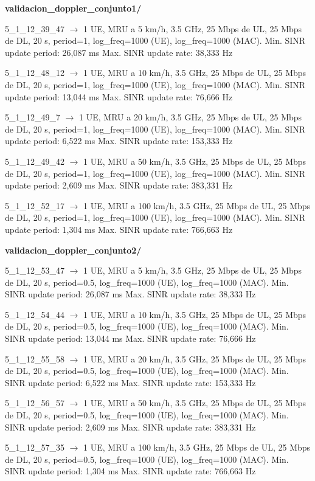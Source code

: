 \documentclass[12pt]{report} %
\begin{document}
\textbf{validacion\_doppler\_conjunto1/}

5\_1\_12\_39\_47 $\rightarrow$ 1 UE, MRU a 5 km/h, 3.5 GHz, 25 Mbps de UL, 25 Mbps de DL, 20 s, period=1, log\_freq=1000 (UE), log\_freq=1000 (MAC).
Min. SINR update period: 26,087 ms
Max. SINR update rate: 38,333 Hz

5\_1\_12\_48\_12 $\rightarrow$ 1 UE, MRU a 10 km/h, 3.5 GHz, 25 Mbps de UL,  25 Mbps de DL, 20 s, period=1, log\_freq=1000 (UE), log\_freq=1000 (MAC).
Min. SINR update period: 13,044 ms
Max. SINR update rate: 76,666 Hz

5\_1\_12\_49\_7 $\rightarrow$ 1 UE, MRU a 20 km/h, 3.5 GHz, 25 Mbps de UL,  25 Mbps de DL, 20 s, period=1, log\_freq=1000 (UE), log\_freq=1000 (MAC).
Min. SINR update period: 6,522 ms
Max. SINR update rate: 153,333 Hz

5\_1\_12\_49\_42 $\rightarrow$ 1 UE, MRU a 50 km/h, 3.5 GHz, 25 Mbps de UL,  25 Mbps de DL, 20 s, period=1, log\_freq=1000 (UE), log\_freq=1000 (MAC).
Min. SINR update period: 2,609 ms
Max. SINR update rate: 383,331 Hz

5\_1\_12\_52\_17 $\rightarrow$ 1 UE, MRU a 100 km/h, 3.5 GHz, 25 Mbps de UL,  25 Mbps de DL, 20 s, period=1, log\_freq=1000 (UE), log\_freq=1000 (MAC).
Min. SINR update period: 1,304 ms
Max. SINR update rate: 766,663 Hz

\textbf{validacion\_doppler\_conjunto2/}

5\_1\_12\_53\_47 $\rightarrow$ 1 UE, MRU a 5 km/h, 3.5 GHz, 25 Mbps de UL,  25 Mbps de DL, 20 s, period=0.5, log\_freq=1000 (UE), log\_freq=1000 (MAC).
Min. SINR update period: 26,087 ms
Max. SINR update rate: 38,333 Hz

5\_1\_12\_54\_44 $\rightarrow$ 1 UE, MRU a 10 km/h, 3.5 GHz, 25 Mbps de UL,  25 Mbps de DL, 20 s, period=0.5, log\_freq=1000 (UE), log\_freq=1000 (MAC).
Min. SINR update period: 13,044 ms
Max. SINR update rate: 76,666 Hz

5\_1\_12\_55\_58 $\rightarrow$ 1 UE, MRU a 20 km/h, 3.5 GHz, 25 Mbps de UL,  25 Mbps de DL, 20 s, period=0.5, log\_freq=1000 (UE), log\_freq=1000 (MAC).
Min. SINR update period: 6,522 ms
Max. SINR update rate: 153,333 Hz

5\_1\_12\_56\_57 $\rightarrow$ 1 UE, MRU a 50 km/h, 3.5 GHz, 25 Mbps de UL,  25 Mbps de DL, 20 s, period=0.5, log\_freq=1000 (UE), log\_freq=1000 (MAC).
Min. SINR update period: 2,609 ms
Max. SINR update rate: 383,331 Hz

5\_1\_12\_57\_35 $\rightarrow$ 1 UE, MRU a 100 km/h, 3.5 GHz, 25 Mbps de UL,  25 Mbps de DL, 20 s, period=0.5, log\_freq=1000 (UE), log\_freq=1000 (MAC).
Min. SINR update period: 1,304 ms
Max. SINR update rate: 766,663 Hz
\end{document}
